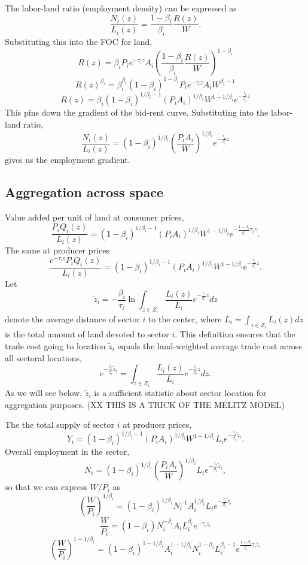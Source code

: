 \documentclass[12pt]{article}
\begin{document}
The labor-land ratio (employment density) can be expressed as
\[
\frac{N_i(z)}{L_i(z)} = \frac{1-\beta_i}{\beta_i}\frac{R(z)}{W}.
\]
Substituting this into the FOC for land,
\[
R(z) =\beta_i P_ie^{-\tau_i z}A_i \left(\frac{1-\beta_i}{\beta_i}\frac{R(z)}{W}\right)^{1-\beta_i}
\]
\[
R(z)^{\beta_i} =\beta_i^{\beta_i}(1-\beta_i)^{1-\beta_i} P_ie^{-\tau_i z}A_i W^{\beta_i-1}
\]
\[
R(z) =\beta_i(1-\beta_i)^{1/\beta_i-1} (P_iA_i)^{1/\beta_i} W^{1-1/\beta_i} e^{-\frac{\tau_i}{\beta_i} z}
\]
This pins down the gradient of the bid-rent curve. Substituting into the labor-land ratio,
\[
\frac{N_i(z)}{L_i(z)} = (1-\beta_i)^{1/\beta_i} \left(\frac{P_iA_i}{W}\right)^{1/\beta_i} e^{-\frac{\tau_i}{\beta_i} z}
\]
gives us the employment gradient.

\subsection{Aggregation across space}
Value added per unit of land at consumer prices,
\[
\frac{P_i Q_i(z)}{L_i(z)} = (1-\beta_i)^{1/\beta_i-1}
(P_iA_i)^{1/\beta_i}W^{1-1/\beta_i}
 e^{-\frac{1-\beta_i}{\beta_i}\tau_i z}.
\]
The same at producer prices
\[
\frac{e^{-\tau_i z} P_i Q_i(z)}{L_i(z)} = (1-\beta_i)^{1/\beta_i-1}
(P_iA_i)^{1/\beta_i}W^{1-1/\beta_i}
 e^{-\frac{\tau_i}{\beta_i} z}.
\]
Let 
\[
\tilde z_i = -
\frac{\beta_i}{\tau_i}
\ln\int_{z\in Z_i} \frac{L_i(z)}{L_i}e^{-\frac{\tau_i}{\beta_i} z}dz
\]
denote the average distance of sector $i$ to the center, where $L_i=\int_{z\in Z_i} L_i(z)dz$ is the total amount of land devoted to sector $i$. This definition ensures that the trade cost going to location $\tilde z_i$ equals the land-weighted average trade cost across all sectoral locations,
\[
e^{-\frac{\tau_i}{\beta_i} \tilde z_i} = \int_{z\in Z_i} \frac{L_i(z)}{L_i}e^{-\frac{\tau_i}{\beta_i} z}dz.
\]
As we will see below, $\tilde z_i$ is a sufficient statistic about sector location for aggregation purposes. (XX THIS IS A TRICK OF THE MELITZ MODEL)

The the total supply of sector $i$ at producer prices,
\[
Y_i = (1-\beta_i)^{1/\beta_i-1}
(P_iA_i)^{1/\beta_i}W^{1-1/\beta_i} L_i e^{-\frac{\tau_i}{\beta_i} \tilde z_i}.
\]
Overall employment in the sector,
\[
N_i = (1-\beta_i)^{1/\beta_i}
\left(\frac{P_iA_i}{W}\right)^{1/\beta_i} L_i e^{-\frac{\tau_i}{\beta_i} \tilde z_i},
\]
so that we can express $W/P_i$ as
\[
\left(\frac{W}{P_i}\right)^{1/\beta_i} = (1-\beta_i)^{1/\beta_i}
N_i^{-1}A_i^{1/\beta_i}
L_i e^{-\frac{\tau_i}{\beta_i} \tilde z_i}
\]
\[
\frac{W}{P_i} = (1-\beta_i)
N_i^{-\beta_i}A_i L_i^{\beta_i}
 e^{-\tau_i\tilde z_i}
\]
\[
\left(\frac{W}{P_i}\right)^{1-1/\beta_i} = (1-\beta_i)^{1-1/\beta_i}
A_i^{1-1/\beta_i}N_i^{1-\beta_i}L_i^{\beta_i-1}
e^{\frac{1-\beta_i}{\beta_i}\tau_i \tilde z_i}
\]
\end{document}
